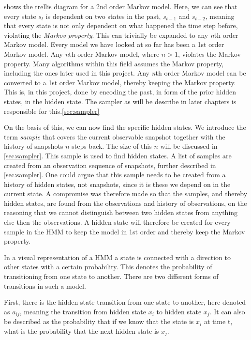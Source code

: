  shows the trellis diagram for a 2nd order Markov model. Here, we can see that every state $s_t$ is dependent on two states in the past, $s_{t-1}$ and $s_{t-2}$, meaning that every state is not only dependent on what happened the time step before, violating the \emph{Markov property}. This can trivially be expanded to any \emph{n}th order Markov model. Every model we have looked at so far has been a 1st order Markov model. Any \emph{n}th order Markov model, where $n>1$, violates the Markov property. Many algorithms within this field assumes the Markov property, including the ones later used in this project. Any \emph{n}th order Markov model can be converted to a 1st order Markov model, thereby keeping the Markov property. This is, in this project, done by encoding the past, in form of the prior hidden states, in the hidden state. The sampler as will be describe in later chapters is responsible for this.\cref{sec:sampler}

On the basis of this, we can now find the specific hidden states. We introduce the term \emph{sample} that covers the current observable snapshot together with the history of snapshots $n$ steps back. The size of this $n$ will be discussed in \cref{sec:sampler}. This sample is used to find hidden states. A list of samples are created from an observation sequence of snapshots, further described in \cref{sec:sampler}. One could argue that this sample needs to be created from a history of hidden states, not snapshots, since it is these we depend on in the current state. A compromise was therefore made so that the samples, and thereby hidden states, are found from the observations and history of observations, on the reasoning that we cannot distinguish between two hidden states from anything else then the observations. A hidden state will therefore be created for every sample in the HMM to keep the model in 1st order and thereby keep the Markov property.

In a visual representation of a HMM a state is connected with a direction to other states with a certain probability. This denotes the probability of transitioning from one state to another. There are two different forms of transitions in such a model.

First, there is the hidden state transition from one state to another, here denoted as $a_{ij}$, meaning the transition from hidden state $x_i$ to hidden state $x_j$. It can also be described as the probability that if we know that the state is $x_i$ at time t, what is the probability that the next hidden state is $x_j$.

